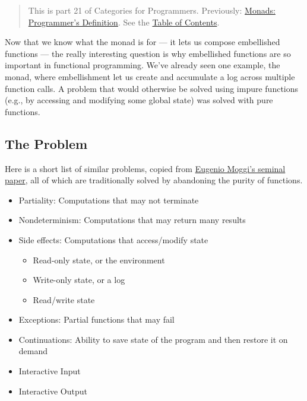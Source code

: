 \begin{quote}
This is part 21 of Categories for Programmers. Previously:
\href{https://bartoszmilewski.com/2016/11/21/monads-programmers-definition/}{Monads:
Programmer's Definition}. See the
\href{https://bartoszmilewski.com/2014/10/28/category-theory-for-programmers-the-preface/}{Table
of Contents}.
\end{quote}

Now that we know what the monad is for --- it lets us compose
embellished functions --- the really interesting question is why
embellished functions are so important in functional programming. We've
already seen one example, the  monad, where embellishment
let us create and accumulate a log across multiple function calls. A
problem that would otherwise be solved using impure functions (e.g., by
accessing and modifying some global state) was solved with pure
functions.

\subsection{The Problem}\label{the-problem}

Here is a short list of similar problems, copied from
\href{https://core.ac.uk/download/pdf/21173011.pdf}{Eugenio Moggi's
seminal paper}, all of which are traditionally solved by abandoning the
purity of functions.

\begin{itemize}
\tightlist
\item
  Partiality: Computations that may not terminate
\item
  Nondeterminism: Computations that may return many results
\item
  Side effects: Computations that access/modify state

  \begin{itemize}
  \tightlist
  \item
    Read-only state, or the environment
  \item
    Write-only state, or a log
  \item
    Read/write state
  \end{itemize}
\item
  Exceptions: Partial functions that may fail
\item
  Continuations: Ability to save state of the program and then restore
  it on demand
\item
  Interactive Input
\item
  Interactive Output
\end{itemize}

